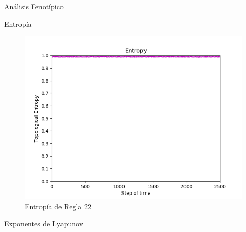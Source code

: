 \documentclass[12pt, letterpaper]{article}
\renewcommand{\rule}{Regla 22}
\begin{document}
\begin{section}{Análisis Fenotípico}
\begin{subsection}{Entropía}
\begin{figure}[H]
    \includegraphics[max width=200mm ,max height=200 mm , keepaspectratio ]{SimEntropy.png} 
    \caption{Entropía de \rule} 
    \end{figure} 
    \end{subsection}
    \begin{subsection}{Exponentes de Lyapunov} 
    \begin{figure}[H] 
    \centering 

\end{figure}
\end{subsection}
\end{section}
\end{document}
